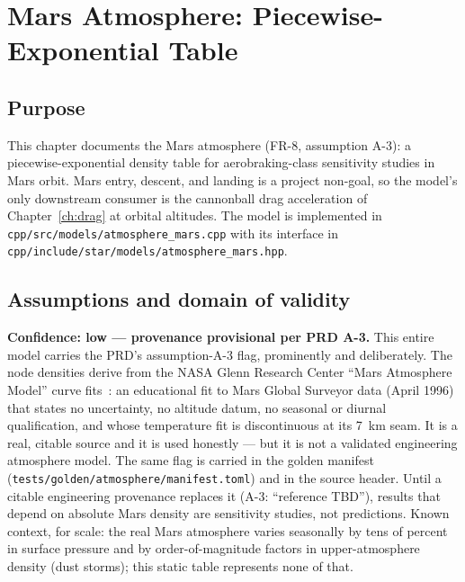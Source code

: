 \chapter{Mars Atmosphere: Piecewise-Exponential Table}
\label{ch:marsatmosphere}

\section{Purpose}
\label{sec:mars:purpose}

This chapter documents the Mars atmosphere (FR-8, assumption A-3): a
piecewise-exponential density table for aerobraking-class sensitivity
studies in Mars orbit. Mars entry, descent, and landing is a project
non-goal, so the model's only downstream consumer is the cannonball drag
acceleration of Chapter~\ref{ch:drag} at orbital altitudes. The model is
implemented in \texttt{cpp/src/models/atmosphere\_mars.cpp} with its
interface in \texttt{cpp/include/star/models/atmosphere\_mars.hpp}.

\section{Assumptions and domain of validity}
\label{sec:mars:domain}

\textbf{Confidence: low --- provenance provisional per PRD A-3.} This
entire model carries the PRD's assumption-A-3 flag, prominently and
deliberately. The node densities derive from the NASA Glenn Research
Center ``Mars Atmosphere Model'' curve fits~\cite{nasaglennmars}: an
educational fit to Mars Global Surveyor data (April 1996) that states no
uncertainty, no altitude datum, no seasonal or diurnal qualification, and
whose temperature fit is discontinuous at its \qty{7}{\kilo\metre} seam.
It is a real, citable source and it is used honestly --- but it is not a
validated engineering atmosphere model. The same flag is carried in the
golden manifest (\texttt{tests/golden/atmosphere/manifest.toml}) and in
the source header. Until a citable engineering provenance replaces it
(A-3: ``reference TBD''), results that depend on absolute Mars density
are sensitivity studies, not predictions. Known context, for scale: the
real Mars atmosphere varies seasonally by tens of percent in surface
pressure and by order-of-magnitude factors in upper-atmosphere density
(dust storms); this static table represents none of that.

